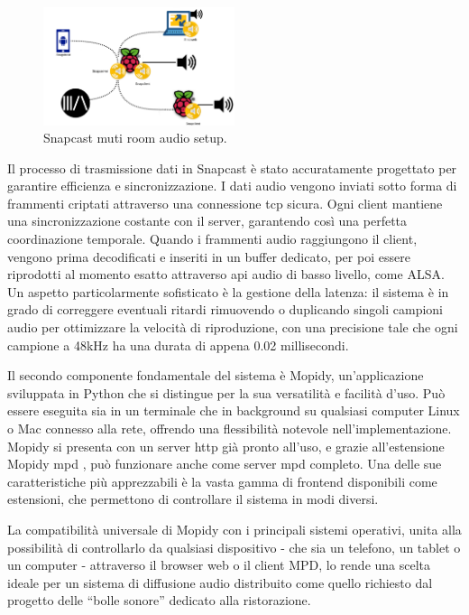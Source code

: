 \begin{figure}[H]
    \centering
    \includegraphics[width=0.5\textwidth]{Chapters/Figures/snapcast_client.png}
    \caption{\small Snapcast muti room audio setup.} 
    \label{fig:snapcast_client}
\end{figure}

Il processo di trasmissione dati in Snapcast è stato accuratamente progettato per garantire efficienza e sincronizzazione. I dati audio vengono inviati sotto forma di frammenti criptati attraverso una connessione \gls{tcp} sicura. Ogni client mantiene una sincronizzazione costante con il server, garantendo così una perfetta coordinazione temporale. Quando i frammenti audio raggiungono il client, vengono prima decodificati e inseriti in un buffer dedicato, per poi essere riprodotti al momento esatto attraverso \gls{api} audio di basso livello, come ALSA. Un aspetto particolarmente sofisticato è la gestione della latenza: il sistema è in grado di correggere eventuali ritardi rimuovendo o duplicando singoli campioni audio per ottimizzare la velocità di riproduzione, con una precisione tale che ogni campione a 48kHz ha una durata di appena 0.02 millisecondi.

Il secondo componente fondamentale del sistema è Mopidy, un'applicazione sviluppata in Python che si distingue per la sua versatilità e facilità d'uso. Può essere eseguita sia in un terminale che in background su qualsiasi computer Linux o Mac connesso alla rete, offrendo una flessibilità notevole nell'implementazione. Mopidy si presenta con un server \gls{http} già pronto all'uso, e grazie all'estensione Mopidy \gls{mpd} , può funzionare anche come server \gls{mpd} completo. Una delle sue caratteristiche più apprezzabili è la vasta gamma di frontend disponibili come estensioni, che permettono di controllare il sistema in modi diversi.

La compatibilità universale di Mopidy con i principali sistemi operativi, unita alla possibilità di controllarlo da qualsiasi dispositivo - che sia un telefono, un tablet o un computer - attraverso il browser web o il client MPD, lo rende una scelta ideale per un sistema di diffusione audio distribuito come quello richiesto dal progetto delle “bolle sonore” dedicato alla ristorazione.

